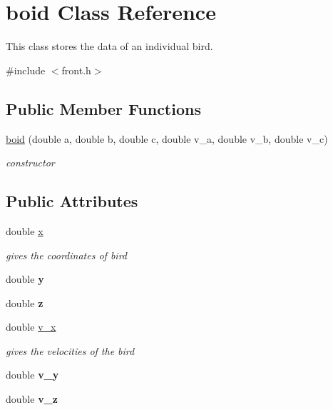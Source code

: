 \hypertarget{classboid}{}\section{boid Class Reference}
\label{classboid}


This class stores the data of an individual bird.  




{\ttfamily \#include $<$front.\+h$>$}

\subsection*{Public Member Functions}
\begin{DoxyCompactItemize}
\item 
\mbox{\label{classboid_a7f890e809b091b4d09a175dff002ccc2}} 
\mbox{\hyperlink{classboid_a7f890e809b091b4d09a175dff002ccc2}{boid}} (double a, double b, double c, double v\+\_\+a, double v\+\_\+b, double v\+\_\+c)
\begin{DoxyCompactList}\small\item\em constructor \end{DoxyCompactList}\end{DoxyCompactItemize}
\subsection*{Public Attributes}
\begin{DoxyCompactItemize}
\item 
\mbox{\label{classboid_ade882db1dabe9a9a789dcce2bfbf1b58}} 
double \mbox{\hyperlink{classboid_ade882db1dabe9a9a789dcce2bfbf1b58}{x}}
\begin{DoxyCompactList}\small\item\em gives the coordinates of bird \end{DoxyCompactList}\item 
\mbox{\label{classboid_a81aa089f81e1015aa9e3ba4b589ad2c8}} 
double {\bfseries y}
\item 
\mbox{\label{classboid_aa6b860da2e02e5346424da4afa2b9c41}} 
double {\bfseries z}
\item 
\mbox{\label{classboid_a2db2bbe850c02f9db647fd59977b572b}} 
double \mbox{\hyperlink{classboid_a2db2bbe850c02f9db647fd59977b572b}{v\+\_\+x}}
\begin{DoxyCompactList}\small\item\em gives the velocities of the bird \end{DoxyCompactList}\item 
\mbox{\label{classboid_ae2b5a94118c330b02924f89e1f0d556a}} 
double {\bfseries v\+\_\+y}
\item 
\mbox{\label{classboid_af2fcca0e33759244109d95774cee4e00}} 
double {\bfseries v\+\_\+z}
\end{DoxyCompactItemize}


